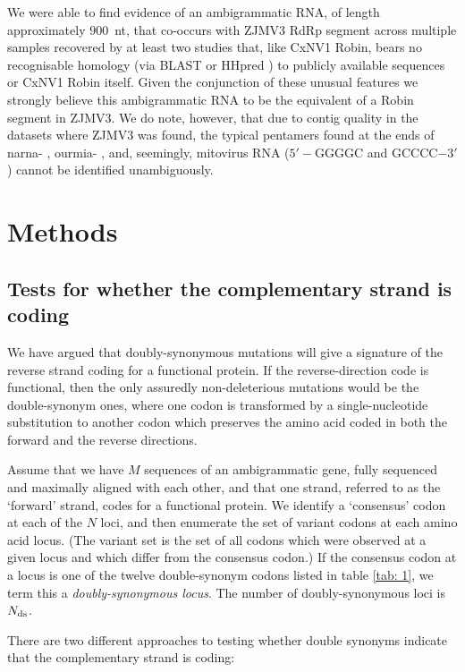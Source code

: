 \documentclass[unnumsec,webpdf,contemporary,large]{oup-authoring-template}%
\theoremstyle{thmstyleone}%
\theoremstyle{thmstyletwo}%
\theoremstyle{thmstylethree}%
\begin{document}
We were able to find evidence of an ambigrammatic RNA, of length approximately
$900$~nt, that co-occurs with ZJMV3 RdRp segment across multiple samples
recovered by at least two studies that, like CxNV1 Robin, bears no recognisable
homology (via BLAST \citep{Altschul1990} or HHpred \citep{finn+11}) to publicly available sequences or CxNV1 Robin itself.  Given the
conjunction of these unusual features we strongly believe this ambigrammatic
RNA to be the equivalent of a Robin segment in ZJMV3. We do note, however,
that due to contig quality in the datasets where ZJMV3 was found, the typical
pentamers found at the ends of narna- \citep{rodriguez-cousino+98}, ourmia-
\citep{wang+20}, and, seemingly, mitovirus \citep{mizutani+18} RNA ($5'-$GGGGC
and GCCCC$-3'$) cannot be identified unambiguously.

\section{Methods}
\label{sec: 4}

\subsection{{\bf Tests for whether the complementary strand is coding}}
\label{sec: 4.1bis}

We have argued that doubly-synonymous mutations will give a signature of the
reverse strand coding for a functional protein. If the reverse-direction code is functional,
then the only assuredly non-deleterious mutations would be the double-synonym ones,
where one codon is transformed by a single-nucleotide substitution to another
codon which preserves the amino acid coded in both the forward and
the reverse directions.

Assume that we have $M$ sequences of an ambigrammatic gene, fully sequenced and
maximally aligned with each other, and that one strand, referred to as the
\lq forward' strand, codes for a functional protein.
We identify a \lq consensus' codon at each of the $N$ loci,
and then enumerate the set of variant codons at each amino acid locus.
(The variant set is the set of all codons which were observed at a given locus and which
differ from the consensus codon.)
If the consensus codon at a locus is one of the twelve
double-synonym codons listed in table \ref{tab: 1}, we term this a \emph{doubly-synonymous locus}.
The number of doubly-synonymous loci is $N_{\rm ds}$.

There are two different approaches to testing whether
double synonyms indicate that the complementary strand is coding:
\end{document}

